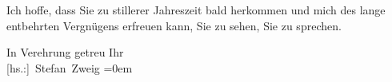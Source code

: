 \pstart
           Ich hoffe, dass Sie zu stillerer Jahreszeit bald herkommen und mich des lange
               entbehrten Vergnügens erfreuen kann, Sie zu sehen, Sie zu sprechen.\pend
           
\pstart
           In Verehrung getreu Ihr{\\[\baselineskip]}\spacefill\mbox{{[}hs.:{]} Stefan Zweig}\pend
           \leftskip=0em{}\endnumbering{}
\begin{anhang}
\end{anhang}
      